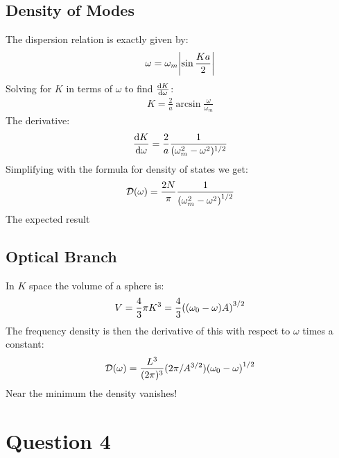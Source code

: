 \documentclass[12pt]{article}
\newcommand{\D}{\mathcal{D}}
\begin{document}
\subsection*{Density of Modes}
The dispersion relation is exactly given by:
\begin{align*}
  \omega=\omega_m\abs{\sin\frac{Ka}{2}}
\end{align*}
Solving for $K$ in terms of $\omega$ to find $\dv{K}{\omega}$:
\begin{align*}
  K=\frac{2}{a}\arcsin\frac{\omega}{\omega_m}
\end{align*}
The derivative:
\begin{align*}
  \dv{K}{\omega}=\frac{2}{a}\frac{1}{(\omega_m^2-\omega^2)^{1/2}}
\end{align*}
Simplifying with the formula for density of states we get:
\begin{align*}
  \D(\omega)=\frac{2N}{\pi}\frac{1}{\qty(\omega_m^2-\omega^2)^{1/2}}
\end{align*}
The expected result
\subsection*{Optical Branch}
In $K$ space the volume of a sphere is:
\begin{align*}
  V=\frac{4}{3}\pi K^3=\frac{4}{3}\qty((\omega_0-\omega)A)^{3/2}
\end{align*}
The frequency density is then the derivative of this with respect to $\omega$ times a constant:
\begin{align*}
  \D(\omega)=\frac{L^3}{(2\pi)^3}(2\pi/A^{3/2})\qty(\omega_0-\omega)^{1/2}
\end{align*}
Near the minimum the density vanishes!
\section*{Question 4}
\end{document}
